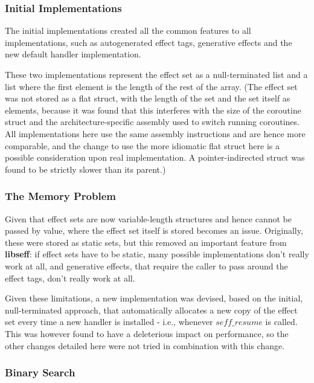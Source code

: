 \documentclass[logo,bsc,singlespacing,parskip,online]{infthesis}
\begin{document}
\subsubsection{Initial Implementations}

The initial implementations created all the common features to all implementations, such as autogenerated effect tags, generative effects and the new default handler implementation.

These two implementations represent the effect set as a null-terminated list and a list where the first element is the length of the rest of the array. (The effect set was not stored as a flat struct, with the length of the set and the set itself as elements, because it was found that this interferes with the size of the coroutine struct and the architecture-specific assembly used to switch running coroutines. All implementations here use the same assembly instructions and are hence more comparable, and the change to use the more idiomatic flat struct here is a possible consideration upon real implementation. A pointer-indirected struct was found to be strictly slower than its parent.)

\subsubsection{The Memory Problem}

Given that effect sets are now variable-length structures and hence cannot be passed by value, where the effect set itself is stored becomes an issue. Originally, these were stored as static sets, but this removed an important feature from \textbf{libseff}: if effect sets have to be static, many possible implementations don't really work at all, and generative effects, that require the caller to pass around the effect tags, don't really work at all.

Given these limitations, a new implementation was devised, based on the initial, null-terminated approach, that automatically allocates a new copy of the effect set every time a new handler is installed - i.e., whenever $seff\_resume$ is called. This was however found to have a deleterious impact on performance, so the other changes detailed here were not tried in combination with this change.

\subsubsection{Binary Search}
\end{document}
